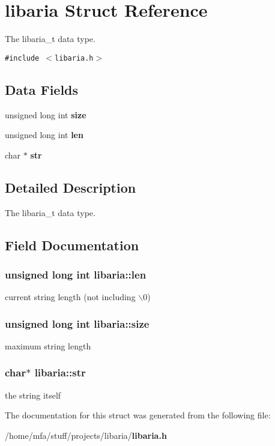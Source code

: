 \section{libaria Struct Reference}
\label{structlibaria}
The libaria\_\-t data type.  


{\tt \#include $<$libaria.h$>$}

\subsection*{Data Fields}
\begin{CompactItemize}
\item 
unsigned long int \bf{size}
\item 
unsigned long int \bf{len}
\item 
char $\ast$ \bf{str}
\end{CompactItemize}


\subsection{Detailed Description}
The libaria\_\-t data type. 



\subsection{Field Documentation}
\subsubsection{\setlength{\rightskip}{0pt plus 5cm}unsigned long int \bf{libaria::len}}\label{structlibaria_ff7c0f6055d0c8bff1adfc99ad93f282}


current string length (not including $\backslash$0) 
\subsubsection{\setlength{\rightskip}{0pt plus 5cm}unsigned long int \bf{libaria::size}}\label{structlibaria_ab1840d6f5b1a85e7534059ec1e9c4a6}


maximum string length 
\subsubsection{\setlength{\rightskip}{0pt plus 5cm}char$\ast$ \bf{libaria::str}}\label{structlibaria_73f782c7fbe0b8d50c7bb8c4ccf811e4}


the string itself 

The documentation for this struct was generated from the following file:\begin{CompactItemize}
\item 
/home/mfa/stuff/projects/libaria/\bf{libaria.h}\end{CompactItemize}
